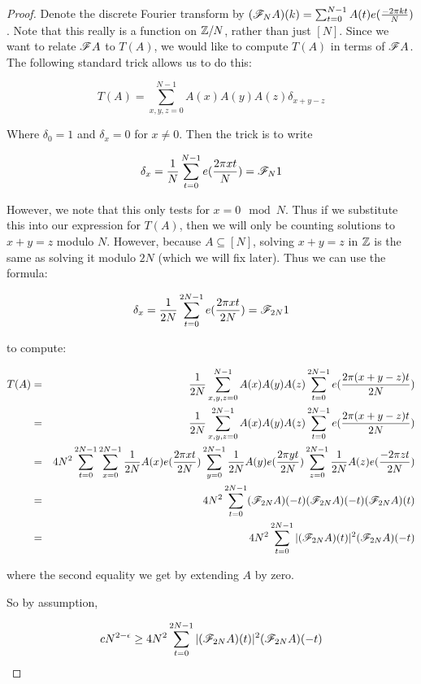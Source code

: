 \documentclass{report}
\theoremstyle{remark}
\numberwithin{equation}{section}
\begin{document}
\begin{proof}
  Denote the discrete Fourier transform by
  $(\mathscr{F}_N A)(k) = \sum_{t=0}^{N-1} A(t) e(\frac{-2\pi k t}{N})$.
  Note that this really is a function on $\mathbb{Z}/N$, rather than just
  $[N]$.  Since we want to relate $\mathscr{F} A$ to $T(A)$, we would like to
  compute $T(A)$ in terms of $\mathscr{F} A$.  The following standard trick
  allows us to do this: 

  \[T(A) = \sum_{x, y, z = 0}^{N-1} A(x)A(y)A(z)\delta_{x+y-z}\]

  Where $\delta_0 = 1$ and $\delta_x = 0$ for $x \neq 0$.  Then the
  trick is to write 

  \[\delta_x = \frac{1}{N} \sum_{t=0}^{N-1} e(\frac{2\pi x t}{N}) = \mathscr{F}_N 1\]

  However, we note that this only tests for $x = 0 \mod{N}$.  Thus if
  we substitute this into our expression for $T(A)$, then we will only
  be counting solutions to $x+y=z$ modulo $N$.  However, because
  $A \subseteq [N]$, solving $x+y=z$ in $\mathbb{Z}$ is the same as solving it
  modulo $2N$ (which we will fix later).  Thus we can use the formula:

  \[\delta_x = \frac{1}{2N} \sum_{t=0}^{2N-1} e(\frac{2\pi x t}{2N}) = \mathscr{F}_{2N} 1\]

  to compute: 

  \begin{eqnarray*}
    T(A) &=& \frac{1}{2N}\sum_{x, y, z = 0}^{N-1} A(x)A(y)A(z)\sum_{t=0}^{2N-1}
             e(\frac{2\pi (x+y-z) t}{2N})\\
         &=& \frac{1}{2N}\sum_{x, y, z = 0}^{2N-1} A(x)A(y)A(z)\sum_{t=0}^{2N-1}
             e(\frac{2\pi (x+y-z) t}{2N})\\
         &=& 4N^2 \sum_{t=0}^{2N-1}
             \sum_{x=0}^{2N-1} \frac{1}{2N} A(x)e(\frac{2\pi x t}{2N}) 
             \sum_{y=0}^{2N-1} \frac{1}{2N} A(y)e(\frac{2\pi y t}{2N}) 
             \sum_{z=0}^{2N-1} \frac{1}{2N} A(z)e(\frac{-2\pi z t}{2N})\\
         &=& 4 N^2 \sum_{t=0}^{2N-1} (\mathscr{F}_{2N}A)(-t)(\mathscr{F}_{2N}A)(-t)(\mathscr{F}_{2N}A)(t)\\
         &=& 4 N^2 \sum_{t=0}^{2N-1} |(\mathscr{F}_{2N}A)(t)|^2(\mathscr{F}_{2N}A)(-t)
  \end{eqnarray*}
  
  where the second equality we get by extending $A$ by zero.  
  
  So by assumption, 

  \[cN^{2-\epsilon} \geq 4 N^2 \sum_{t=0}^{2N-1} |(\mathscr{F}_{2N}A)(t)|^2(\mathscr{F}_{2N}A)(-t)\]


\end{proof}
\end{document}
